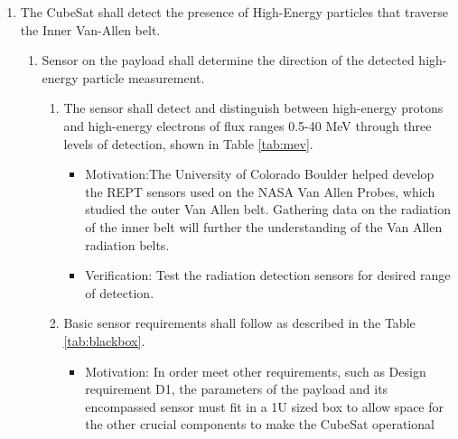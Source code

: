 \begin{enumerate}
\begin{enumerate}
\begin{enumerate}
                        \begin{itemize}
                            \item Motivation:  In the case of a SEE, the CubeSat must either fix itself by resetting hardware or signal the error so it can be accounted for in data processing.
                            \item Verification: If proton beam testing is available, then the system can be tested to assure solutions exist. If not, then the systems for repair must be put in place and tested synthetically. 
                        \end{itemize}
                \end{enumerate}
        \end{enumerate} %
        \item The CubeSat shall detect the presence of High-Energy particles that traverse the Inner Van-Allen belt.
            \begin{enumerate}
                \item Sensor on the payload shall determine the direction of the detected high-energy particle measurement.
                    \begin{enumerate}
                        \item The sensor shall detect and distinguish between high-energy protons and high-energy electrons of flux ranges 0.5-40 MeV through three levels of detection, shown in Table \ref{tab:mev}.
                            \begin{itemize}
                        \item Motivation:The University of Colorado Boulder helped develop the REPT sensors used on the NASA Van Allen Probes, which studied the outer Van Allen belt. Gathering data on the radiation of the inner belt will further the understanding of the Van Allen radiation belts. 
                        \item Verification: Test the radiation detection sensors for desired range of detection.
                    \end{itemize}
                    \item  Basic sensor requirements shall follow as described in the Table \ref{tab:blackbox}.
                        \begin{itemize}
                            \item Motivation: In order meet other requirements, such as Design requirement D1, the parameters of the payload and its encompassed sensor must fit in a 1U sized box to allow space for the other crucial components to make the CubeSat operational 

\end{itemize}
\end{enumerate}
\end{enumerate}
\end{enumerate}
